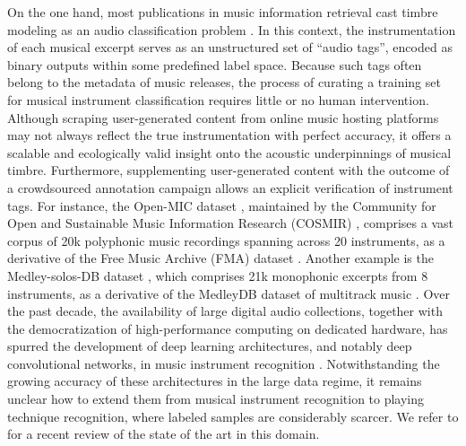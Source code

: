 \documentclass{bmcart}
\begin{document}
On the one hand, most publications in music information retrieval cast timbre modeling as an audio classification problem  \cite{martin1998asa,brown1999jasa,eronen2000icassp,herrera2003jnmr,wieczorkowska2003jiis,livshin2004dafx,krishna2004icassp,kaminskyj2005jiis,benetos2006icassp,bhalke2016jiis,joder2009taslp}.
In this context, the instrumentation of each musical excerpt serves as an unstructured set of ``audio tags'', encoded as binary outputs within some predefined label space.
Because such tags often belong to the metadata of music releases, the process of curating a training set for musical instrument classification requires little or no human intervention.
Although scraping user-generated content from online music hosting platforms may not always reflect the true instrumentation with perfect accuracy, it offers a scalable and ecologically valid insight onto the acoustic underpinnings of musical timbre.
Furthermore, supplementing user-generated content with the outcome of a crowdsourced annotation campaign allows an explicit verification of instrument tags.
For instance, the Open-MIC dataset \cite{humphrey2018ismir}, maintained by the Community for Open and Sustainable Music Information Research (COSMIR) \cite{mcfee2016ismir}, comprises a vast corpus of 20k polyphonic music recordings spanning across 20 instruments, as a derivative of the Free Music Archive (FMA) dataset \cite{defferrard2017ismir}.
Another example is the Medley-solos-DB dataset \cite{lostanlen2016ismir}, which comprises 21k monophonic excerpts from 8 instruments, as a derivative of the MedleyDB dataset of multitrack music \cite{bittner2014ismir}.
Over the past decade, the availability of large digital audio collections, together with the democratization of high-performance computing on dedicated hardware, has spurred the development of deep learning architectures, and notably deep convolutional networks, in music instrument recognition \cite{mcfee2015ismir,pons2017eusipco,gururani2018ismir}.
Notwithstanding the growing accuracy of these architectures in the large data regime, it remains unclear how to extend them from musical instrument recognition to playing technique recognition, where labeled samples are considerably scarcer.
We refer to \cite{han2017taslp} for a recent review of the state of the art in this domain.
\end{document}
